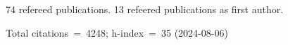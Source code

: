 74 refereed publications. 13 refeered publications as first author.

Total citations~=~4248; h-index~=~35 (2024-08-06)